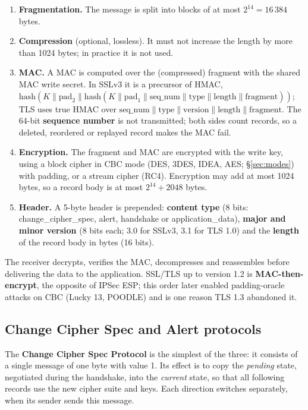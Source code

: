 \begin{enumerate}
  \item \textbf{Fragmentation.} The message is split into blocks of at most $2^{14} = 16\,384$ bytes.
  \item \textbf{Compression} (optional, lossless). It must not increase the length by more than 1024 bytes; in practice it is not used.
  \item \textbf{MAC.} A MAC is computed over the (compressed) fragment with the shared MAC write secret. In SSLv3 it is a precursor of HMAC, $\mathrm{hash}(K \| \mathrm{pad}_2 \| \mathrm{hash}(K \| \mathrm{pad}_1 \| \mathrm{seq\_num} \| \mathrm{type} \| \mathrm{length} \| \mathrm{fragment}))$; TLS uses true HMAC over $\mathrm{seq\_num} \| \mathrm{type} \| \mathrm{version} \| \mathrm{length} \| \mathrm{fragment}$. The 64-bit \textbf{sequence number} is not transmitted; both sides count records, so a deleted, reordered or replayed record makes the MAC fail.
  \item \textbf{Encryption.} The fragment and MAC are encrypted with the write key, using a block cipher in CBC mode (DES, 3DES, IDEA, AES; \S\ref{sec:modes}) with padding, or a stream cipher (RC4). Encryption may add at most 1024 bytes, so a record body is at most $2^{14} + 2048$ bytes.
  \item \textbf{Header.} A 5-byte header is prepended: \textbf{content type} (8 bits: change\_cipher\_spec, alert, handshake or application\_data), \textbf{major and minor version} (8 bits each; 3.0 for SSLv3, 3.1 for TLS 1.0) and the \textbf{length} of the record body in bytes (16 bits).
\end{enumerate}
The receiver decrypts, verifies the MAC, decompresses and reassembles before delivering the data to the application. SSL/TLS up to version 1.2 is \textbf{MAC-then-encrypt}, the opposite of IPSec ESP; this order later enabled padding-oracle attacks on CBC (Lucky 13, POODLE) and is one reason TLS 1.3 abandoned it.

\subsection{Change Cipher Spec and Alert protocols \new}

The \textbf{Change Cipher Spec Protocol} is the simplest of the three: it consists of a single message of one byte with value 1. Its effect is to copy the \emph{pending} state, negotiated during the handshake, into the \emph{current} state, so that all following records use the new cipher suite and keys. Each direction switches separately, when its sender sends this message.

